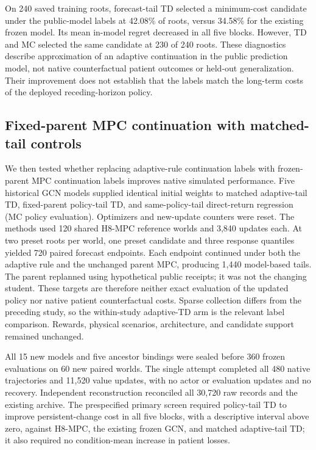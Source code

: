 \documentclass[preprint,review,12pt]{elsarticle}
\begin{document}
On 240 saved training roots, forecast-tail TD selected a minimum-cost candidate
under the public-model labels at 42.08\% of roots, versus 34.58\% for the
existing frozen model. Its mean in-model regret decreased in all five blocks.
However, TD and MC selected the same candidate at 230 of 240 roots. These
diagnostics describe approximation of an adaptive continuation in the public
prediction model, not native counterfactual patient outcomes or held-out
generalization. Their improvement does not establish that the labels match
the long-term costs of the deployed receding-horizon policy.

\subsection{Fixed-parent MPC continuation with matched-tail controls}
\label{sec:policy-tail-development}

We then tested whether replacing adaptive-rule continuation labels with
frozen-parent MPC continuation labels improves native simulated performance.
Five historical GCN models supplied identical initial weights to matched
adaptive-tail TD, fixed-parent policy-tail TD, and same-policy-tail direct-return
regression (MC policy evaluation). Optimizers and new-update counters were reset.
The methods used 120 shared H8-MPC reference worlds and 3,840 updates each.
At two preset roots per world, one preset candidate and three response quantiles
yielded 720 paired forecast endpoints. Each endpoint continued under both the
adaptive rule and the unchanged parent MPC, producing 1,440 model-based tails.
The parent replanned using hypothetical public receipts; it was not the changing
student. These targets are therefore neither exact evaluation of the updated
policy nor native patient counterfactual costs. Sparse collection differs from
the preceding study, so the within-study adaptive-TD arm is the relevant label
comparison. Rewards, physical scenarios, architecture, and candidate support
remained unchanged.

All 15 new models and five ancestor bindings were sealed before 360 frozen
evaluations on 60 new paired worlds. The single attempt completed all 480 native
trajectories and 11,520 value updates, with no actor or evaluation updates and no
recovery. Independent reconstruction reconciled all 30,720 raw records and the
existing archive. The prespecified primary screen required policy-tail TD to
improve persistent-change cost in all five blocks, with a descriptive interval
above zero, against H8-MPC, the existing frozen GCN, and matched adaptive-tail TD;
it also required no condition-mean increase in patient losses.
\end{document}
